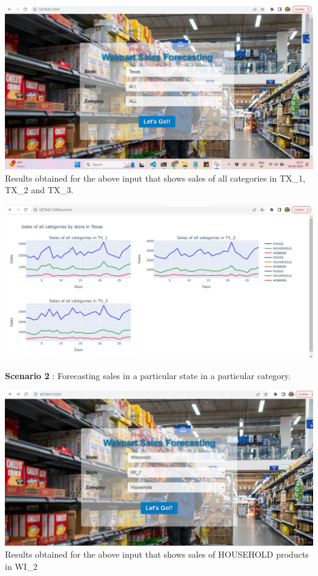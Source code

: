 \documentclass[fleqn,10pt]{SelfArx} %
\begin{document}
\includegraphics[scale=0.1]{1.jpeg}
\\Results obtained for the above input that shows sales of all categories in TX\_1, TX\_2 and TX\_3.

\includegraphics[scale=0.1]{2.jpeg}
\item\textbf{Scenario 2} :
Forecasting sales in a particular state in a particular category.

\includegraphics[scale=0.1]{3.jpeg}
\\ Results obtained for the above input that shows sales of HOUSEHOLD products in WI\_2
\end{document}
